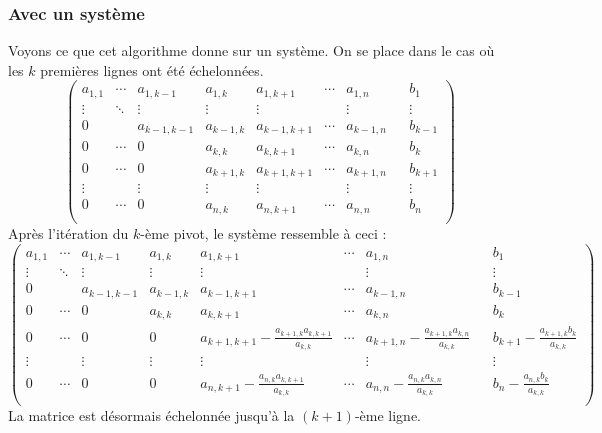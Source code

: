 \documentclass[french]{article}
\begin{document}
\subsubsection{Avec un système}
Voyons ce que cet algorithme donne sur un système. On se place dans le cas où les $k$ premières lignes ont été échelonnées.
\begin{equation*}
	\begin{pmatrix}
		a_{1,1} & \cdots & a_{1,k-1} & a_{1,k} & a_{1,k+1} & \cdots & a_{1,n}&&b_1\\
		\vdots  & \ddots & \vdots & \vdots & \vdots & & \vdots&&\vdots\\
		0 & & a_{k-1,k-1} & a_{k-1,k} & a_{k-1,k+1} & \cdots & a_{k-1,n}&&b_{k-1}\\
		0 & \cdots & 0 & a_{k,k} & a_{k,k+1} & \cdots & a_{k,n}&&b_k\\
		0 & \cdots & 0 & a_{k+1,k} & a_{k+1,k+1} & \cdots & a_{k+1,n}&&b_{k+1}\\
		\vdots  & & \vdots & \vdots & \vdots & & \vdots&&\vdots\\
		0 & \cdots & 0 & a_{n,k} & a_{n,k+1} & \cdots & a_{n,n}&&b_n\\
	\end{pmatrix}
\end{equation*}
Après l'itération du $k$-ème pivot, le système ressemble à ceci :
\begin{equation*}
	\begin{pmatrix}
		a_{1,1} & \cdots & a_{1,k-1} & a_{1,k} & a_{1,k+1} & \cdots & a_{1,n}&&b_1\\
		\vdots  & \ddots & \vdots & \vdots & \vdots & & \vdots&&\vdots\\
		0 & & a_{k-1,k-1} & a_{k-1,k} & a_{k-1,k+1} & \cdots & a_{k-1,n}&&b_{k-1}\\
		0 & \cdots & 0 & a_{k,k} & a_{k,k+1} & \cdots & a_{k,n}&&b_k\\
		0 & \cdots & 0 & 0 & a_{k+1,k+1}-\frac{a_{k+1,k} a_{k,k+1}}{a_{k,k}} & \cdots & a_{k+1,n}-\frac{a_{k+1,k} a_{k,n}}{a_{k,k}}&&b_{k+1}-\frac{a_{k+1,k} b_k}{a_{k,k}}\\
		\vdots  & & \vdots & \vdots & \vdots & & \vdots&&\vdots\\
		0 & \cdots & 0 & 0 & a_{n,k+1}-\frac{a_{n,k} a_{k,k+1}}{a_{k,k}} & \cdots & a_{n,n}-\frac{a_{n,k} a_{k,n}}{a_{k,k}}&&b_n-\frac{a_{n,k} b_k}{a_{k,k}}\\
	\end{pmatrix}
\end{equation*}
La matrice est désormais échelonnée jusqu'à la $(k+1)$-ème ligne.
\end{document}
